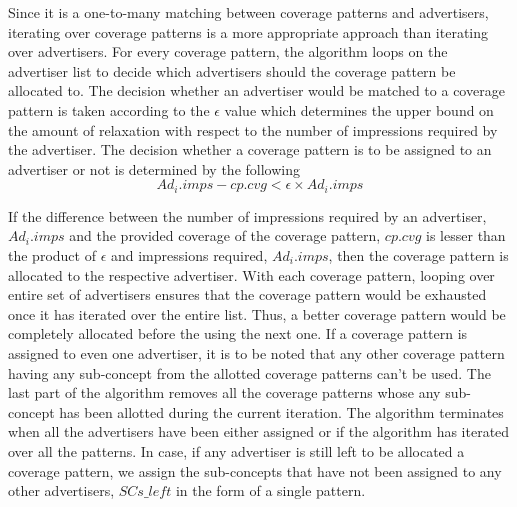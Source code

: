 \begin{enumerate}[label=(\Alph*)]
Since it is a one-to-many matching between coverage patterns and advertisers, iterating over coverage patterns is a more appropriate approach than iterating over advertisers. For every coverage pattern, the algorithm loops on the advertiser list to decide which advertisers should the coverage pattern be allocated to. The decision whether an advertiser would be matched to a coverage pattern is taken according to the $\epsilon$ value which determines the upper bound on the amount of relaxation with respect to the number of impressions required by the advertiser. The decision whether a coverage pattern is to be assigned to an advertiser or not is determined by the following
\begin{equation}
Ad_{i}.imps - cp.cvg < \epsilon \times Ad_{i}.imps
\end{equation}



If the difference between the number of impressions required by an advertiser, $Ad_{i}.imps$ and the provided coverage of the coverage pattern, $cp.cvg$ is lesser than the product of $\epsilon$ and impressions required, $Ad_{i}.imps$, then the coverage pattern is allocated to the respective advertiser. With each coverage pattern, looping over entire set of advertisers ensures that the coverage pattern would be exhausted once it has iterated over the entire list. Thus, a better coverage pattern would be completely allocated before the using the next one. If a coverage pattern is assigned to even one advertiser, it is to be noted that any other coverage pattern having any sub-concept from the allotted coverage patterns can't be used. The last part of the algorithm removes all the coverage patterns whose any sub-concept has been allotted during the current iteration. The algorithm terminates when all the advertisers have been either assigned or if the algorithm has iterated over all the patterns. In case, if any advertiser is still left to be allocated a coverage pattern, we assign the sub-concepts that have not been assigned to any other advertisers, $SCs\_left$ in the form of a single pattern.\par
\end{enumerate}





